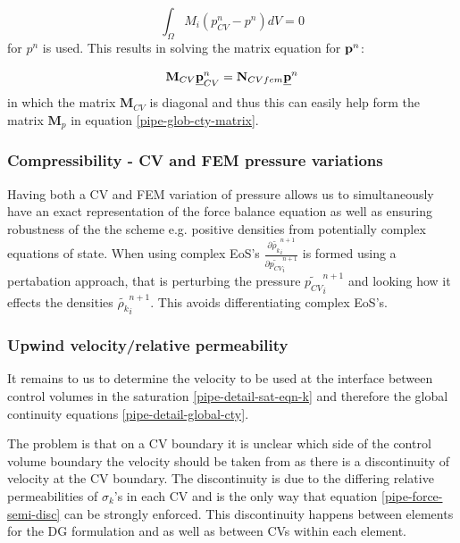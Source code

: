 \begin{equation}
\int_{\Omega} M_i (p_{CV}^n-p^n) dV =0
\end{equation}
for $p^n$ is used. This results in solving the matrix
equation for ${\bf p}^n$:

\begin{equation}
{\mathbf M}_{CV} \underline{\bf p}_{CV}^n = {\mathbf N}_{CVfem} \underline {\bf p}^n
\end{equation}
in which the matrix ${\mathbf M}_{CV}$ is diagonal and thus
this can easily help form the matrix ${\mathbf M}_p$ in equation
\ref{pipe-glob-cty-matrix}.

\subsubsection{Compressibility - CV and FEM pressure variations}

Having both a CV and FEM variation of pressure allows us to
simultaneously have an exact representation of the force balance
equation as well as ensuring robustness of the the scheme
e.g. positive densities from potentially complex equations
of state. When using complex EoS's $\frac{\partial \tilde { \rho_k}_i^{n+1}}{\partial \tilde {p_{CV}}_i^{n+1}}$ is formed
using a pertabation approach, that is
perturbing the pressure $\tilde {p_{CV}}_i^{n+1}$ and looking how
it effects the densities $\tilde {\rho_k}_i^{n+1}$. This
avoids differentiating complex EoS's.



\subsubsection{Upwind velocity/relative permeability}
\label{pipe-opt-up}

It remains to us to determine the velocity to be used
at the interface between control volumes in the
saturation \ref{pipe-detail-sat-eqn-k} and therefore
the global continuity equations \ref{pipe-detail-global-cty}.

The problem is that on a CV boundary it is unclear
which side of the control volume boundary the velocity
should be taken from as there is a discontinuity
of velocity at the CV boundary. The discontinuity
is due to the differing relative permeabilities of
$\sigma_k$'s in each CV and is the only way that
equation \ref{pipe-force-semi-disc} can be strongly enforced.
This discontinuity happens between elements for the DG
formulation and as well as between CVs within each element.

